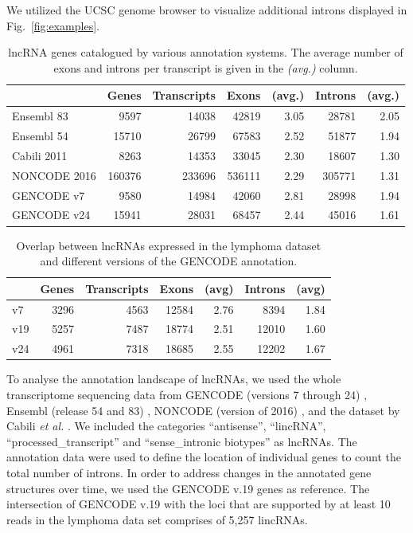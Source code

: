 \documentclass[ncrna,article,submit,moreauthors,pdftex,10pt,a4paper]{mdpi}
\begin{document}
We utilized the UCSC genome browser \cite{Kent:02} to visualize additional introns displayed in Fig.\ \ref{fig:examples}.

\begin{table}[ht]
  \caption{lncRNA genes catalogued by various annotation systems. The
    average number of exons and introns per transcript is given in the
    \emph{(avg.)} column.} 
\label{tab:consortia}
\begin{center}\small
\begin{tabular}{|l|rr|rr|rr|}
  \hline
  & Genes & Transcripts & Exons & (avg.) & 
                        Introns & (avg.) \\ 
   \hline
  Ensembl 83   &   9597 &  14038 &  42819 & 3.05 &  28781 & 2.05 \\ 
  Ensembl 54   &  15710 &  26799 &  67583 & 2.52 &  51877 & 1.94 \\ 
  Cabili 2011  &   8263 &  14353 &  33045 & 2.30 &  18607 & 1.30 \\ 
  NONCODE 2016 & 160376 & 233696 & 536111 & 2.29 & 305771 & 1.31 \\ 
  GENCODE v7   &   9580 &  14984 &  42060 & 2.81 &  28998 & 1.94 \\ 
  GENCODE v24  &  15941 &  28031 &  68457 & 2.44 &  45016 & 1.61 \\ 
   \hline
\end{tabular}
\end{center}
\end{table}

\begin{table}[ht]
  \caption{Overlap between lncRNAs expressed in the lymphoma dataset 
    and different versions of the GENCODE annotation.} 
\label{tab:gencode}
\begin{center}\small
\begin{tabular}{|l|rr|rr|rr|}
  \hline
  & Genes & Transcripts & Exons & (avg) & Introns & (avg) \\ 
   \hline
  v7  & 3296 & 4563 & 12584 & 2.76 &  8394 & 1.84 \\
  v19 & 5257 & 7487 & 18774 & 2.51 & 12010 & 1.60 \\
  v24 & 4961 & 7318 & 18685 & 2.55 & 12202 & 1.67 \\ 
   \hline
\end{tabular}
\end{center}
\end{table}

To analyse the annotation landscape of lncRNAs, we used the whole
transcriptome sequencing data from GENCODE (versions 7 through 24)
\cite{harrow2012}, Ensembl (release 54 and 83) \cite{flicek2014}, NONCODE
(version of 2016) \cite{zhao2016}, and the dataset by Cabili \textit{et
  al.}  \cite{cabili2011}. We included the categories ``antisense'',
``lincRNA'', ``processed\_transcript'' and ``sense\_intronic biotypes'' as
lncRNAs.  The annotation data were used to define the location of
individual genes to count the total number of introns. In order to address
changes in the annotated gene structures over time, we used the GENCODE v.19
genes as reference. The intersection of GENCODE v.19 with the loci that are
supported by at least 10 reads in the lymphoma data set comprises of 5,257
lincRNAs.
\end{document}
